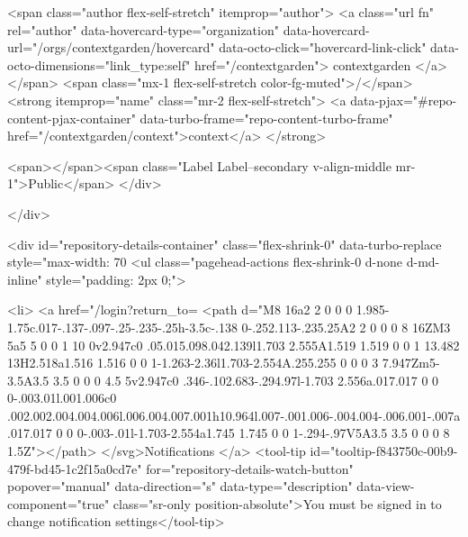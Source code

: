     <span class="author flex-self-stretch" itemprop="author">
      <a class="url fn" rel="author" data-hovercard-type="organization" data-hovercard-url="/orgs/contextgarden/hovercard" data-octo-click="hovercard-link-click" data-octo-dimensions="link_type:self" href="/contextgarden">
        contextgarden
</a>    </span>
    <span class="mx-1 flex-self-stretch color-fg-muted">/</span>
    <strong itemprop="name" class="mr-2 flex-self-stretch">
      <a data-pjax="#repo-content-pjax-container" data-turbo-frame="repo-content-turbo-frame" href="/contextgarden/context">context</a>
    </strong>

    <span></span><span class="Label Label--secondary v-align-middle mr-1">Public</span>
  </div>


        </div>

        <div id="repository-details-container" class="flex-shrink-0" data-turbo-replace style="max-width: 70%
            <ul class="pagehead-actions flex-shrink-0 d-none d-md-inline" style="padding: 2px 0;">
    
      

  <li>
            <a href="/login?return_to=%
    <path d="M8 16a2 2 0 0 0 1.985-1.75c.017-.137-.097-.25-.235-.25h-3.5c-.138 0-.252.113-.235.25A2 2 0 0 0 8 16ZM3 5a5 5 0 0 1 10 0v2.947c0 .05.015.098.042.139l1.703 2.555A1.519 1.519 0 0 1 13.482 13H2.518a1.516 1.516 0 0 1-1.263-2.36l1.703-2.554A.255.255 0 0 0 3 7.947Zm5-3.5A3.5 3.5 0 0 0 4.5 5v2.947c0 .346-.102.683-.294.97l-1.703 2.556a.017.017 0 0 0-.003.01l.001.006c0 .002.002.004.004.006l.006.004.007.001h10.964l.007-.001.006-.004.004-.006.001-.007a.017.017 0 0 0-.003-.01l-1.703-2.554a1.745 1.745 0 0 1-.294-.97V5A3.5 3.5 0 0 0 8 1.5Z"></path>
</svg>Notifications
</a>    <tool-tip id="tooltip-f843750c-00b9-479f-bd45-1c2f15a0cd7e" for="repository-details-watch-button" popover="manual" data-direction="s" data-type="description" data-view-component="true" class="sr-only position-absolute">You must be signed in to change notification settings</tool-tip>

